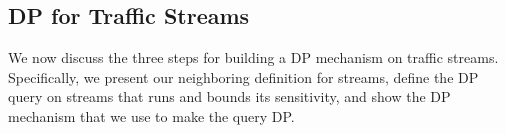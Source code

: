\subsection{DP for Traffic Streams}
\label{subsec:building-blocks}

We now discuss the three steps for building a DP mechanism on
traffic streams. Specifically, we present our neighboring definition for
streams, define the DP query on streams that {\sys} runs and bounds its sensitivity,
and show the DP mechanism that we use to make the query DP.



